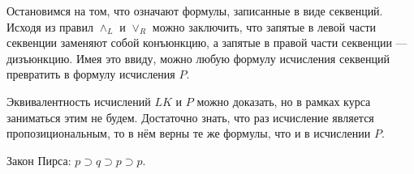 \begin{remark}
    Остановимся на том, что означают формулы, записанные в виде секвенций. Исходя из правил $\land_L$ и $\lor_R$ можно заключить, что запятые в левой части секвенции заменяют собой конъюнкцию, а запятые в правой части секвенции --- дизъюнкцию. Имея это ввиду, можно любую формулу исчисления секвенций превратить в формулу исчисления $P$.
\end{remark}

\begin{remark}
    Эквивалентность исчислений $LK$ и $P$ можно доказать, но в рамках курса заниматься этим не будем. Достаточно знать, что раз исчисление является пропозициональным, то в нём верны те же формулы, что и в исчислении $P$.
\end{remark}

\begin{propthm}
    Закон Пирса: $p \supset q \supset p \supset p$.
\end{propthm}

